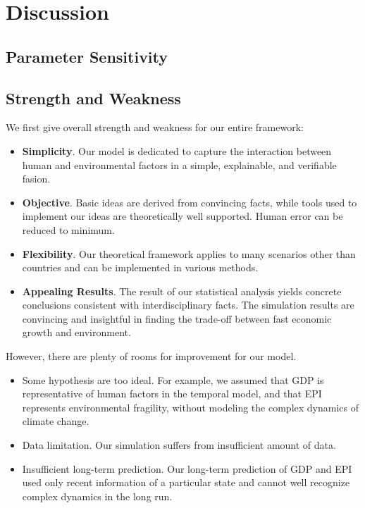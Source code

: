 \section{Discussion}


\subsection{Parameter Sensitivity}

\subsection{Strength and Weakness}
We first give overall strength and weakness for our entire framework:
\begin{itemize}
   \item \textbf{Simplicity}. Our model is dedicated to capture the interaction between human and environmental factors in a simple, explainable, and verifiable fasion.
   \item \textbf{Objective}. Basic ideas are derived from convincing facts, while tools used to implement our ideas are theoretically well supported. Human error can be reduced to minimum. 
   \item \textbf{Flexibility}. Our theoretical framework applies to many scenarios other than countries and can be implemented in various methods. 
   \item \textbf{Appealing Results}. The result of our statistical analysis yields concrete conclusions consistent with interdisciplinary facts. The simulation results are convincing and insightful in finding the trade-off between fast economic growth and environment.
\end{itemize}

However, there are plenty of rooms for improvement for our model. 
\begin{itemize}
   \item Some hypothesis are too ideal. For example, we assumed that GDP is representative of human factors in the temporal model, and that EPI represents environmental fragility, without modeling the complex dynamics of climate change.
   \item Data limitation. Our simulation suffers from insufficient amount of data.
   \item Insufficient long-term prediction. Our long-term prediction of GDP and EPI used only recent information of a particular state and cannot well recognize complex dynamics in the long run.
\end{itemize}


